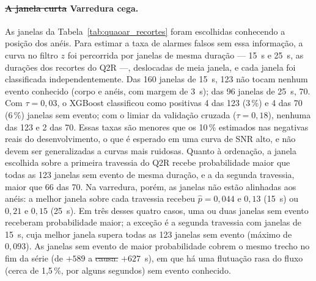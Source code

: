 \documentclass[msc]{on} %
\makeatletter
\providecommand{\DIFaddtex}[1]{{\protect\color{red}#1}} %
\providecommand{\DIFdeltex}[1]{{\protect\color{red}\sout{#1}}} %
\providecommand{\DIFaddbegin}{} %
\providecommand{\DIFaddend}{} %
\providecommand{\DIFdelbegin}{} %
\providecommand{\DIFdelend}{} %
\providecommand{\DIFadd}[1]{\texorpdfstring{\DIFaddtex{#1}}{#1}} %
\providecommand{\DIFdel}[1]{\texorpdfstring{\DIFdeltex{#1}}{}} %
\let\sout@orig\sout %
\renewcommand{\sout}[1]{\ifmmode\text{\sout@orig{\ensuremath{#1}}}\else\sout@orig{#1}\fi} %
\makeatother
\begin{document}
\paragraph{\DIFdelbegin \DIFdel{A janela curta }\DIFdelend\ifhmode\hskip0pt\fi \DIFaddbegin \DIFadd{Varredura cega.}} \DIFadd{As janelas da Tabela~\ref{tab:quaoar_recortes} foram escolhidas conhecendo a posição dos anéis. Para estimar a taxa de alarmes falsos sem essa informação, a curva no filtro $z$ foi percorrida por janelas de mesma duração --- 15~s e 25~s, as durações dos recortes do Q2R ---, deslocadas de meia janela, e cada janela foi classificada independentemente. Das 160 janelas de 15~s, 123 }\DIFaddend não \DIFaddbegin \DIFadd{tocam nenhum evento conhecido (corpo e anéis, com margem de 3~s); das 96 janelas de 25~s, 70. Com $\tau = 0{,}03$, o XGBoost classificou como positivas 4 das 123 (3\,\%) e 4 das 70 (6\,\%) janelas sem evento; com o limiar da validação cruzada ($\tau = 0{,}18$), nenhuma das 123 e 2 das 70. Essas taxas são menores que os 10\,\% estimados nas negativas reais do desenvolvimento, o que }\DIFaddend é \DIFaddbegin \DIFadd{esperado em uma curva de SNR alto, e não devem ser generalizadas a curvas mais ruidosas. Quanto à ordenação, a janela escolhida sobre a primeira travessia do Q2R recebe probabilidade maior que todas as 123 janelas sem evento de mesma duração, e a da segunda travessia, maior que 66 das 70. Na varredura, porém, as janelas não estão alinhadas aos anéis: a melhor janela sobre cada travessia recebeu $\hat{p} = 0{,}044$ e $0{,}13$ (15~s) ou $0{,}21$ e $0{,}15$ (25~s). Em três desses quatro casos, uma ou duas janelas sem evento receberam probabilidade maior; a exceção é a segunda travessia com janelas de 15~s, cuja melhor janela supera todas as 123 janelas sem evento (máximo de $0{,}093$). As janelas sem evento de maior probabilidade cobrem o mesmo trecho no fim da série (de $+589$ }\DIFaddend a \DIFdelbegin \DIFdel{causa.}%
\DIFdelend\ifhmode\hskip0pt\fi \DIFaddbegin \DIFadd{$+627$~s), em que há uma flutuação rasa do fluxo (cerca de 1,5\,\%, por alguns segundos) sem evento conhecido.
}
\end{document}
